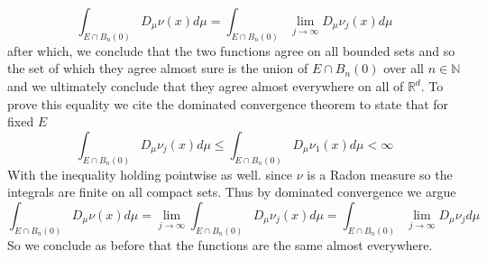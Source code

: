 \documentclass[11pt]{article}
\begin{document}
{ \[
\int_{E \cap B_n(0)}^{}D_\mu \nu(x)d \mu = \int_{E \cap B_n(0)}^{} \lim_{j\to \infty} D_\mu \nu_j(x) d \mu
\] 
after which, we conclude that the two functions agree on all bounded sets and so the set of which they agree almost sure is the union of $E \cap B_n(0)$ over all  $n \in \mathbb{N}$ and we ultimately conclude that they agree almost everywhere on all of $ \mathbb{R}^{d}$.
To prove this equality we cite the dominated convergence theorem to state that for fixed $E$
 \[
\int_{E \cap B_n(0)}^{}D_\mu \nu_j(x) d \mu \le \int_{ E \cap B_n(0)}^{} D_\mu \nu_1(x) d \mu < \infty
\] 
With the inequality holding pointwise as well.
since $\nu$ is a Radon measure so the integrals are finite on all compact sets. Thus by dominated convergence we argue
\[
    \int_{E \cap B_n(0)}^{} D_\mu \nu(x) d \mu = \lim_{j\to \infty}\int_{E \cap B_n(0)}^{}D_\mu \nu_j(x) d \mu = \int_{E \cap B_n(0)}^{}\lim_{j\to \infty}D_\mu \nu_j d \mu
\] 
So we conclude as before that the functions are the same almost everywhere.
}
\end{document}
